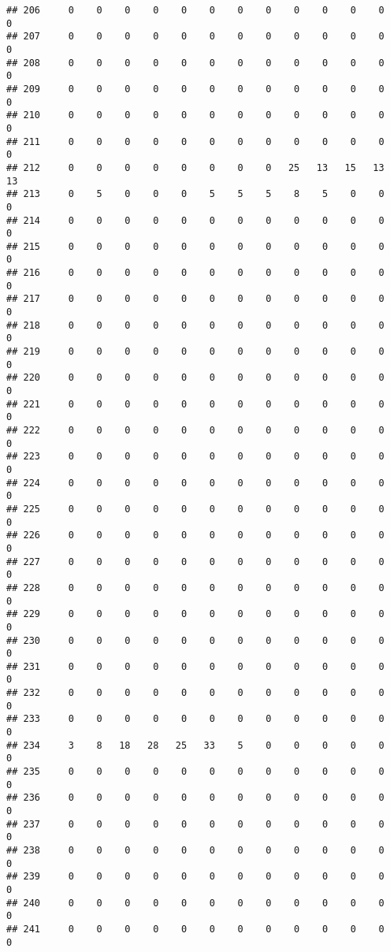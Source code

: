 \documentclass[]{article}
\begin{document}
\begin{verbatim}
## 206     0    0    0    0    0    0    0    0    0    0    0    0    0
## 207     0    0    0    0    0    0    0    0    0    0    0    0    0
## 208     0    0    0    0    0    0    0    0    0    0    0    0    0
## 209     0    0    0    0    0    0    0    0    0    0    0    0    0
## 210     0    0    0    0    0    0    0    0    0    0    0    0    0
## 211     0    0    0    0    0    0    0    0    0    0    0    0    0
## 212     0    0    0    0    0    0    0    0   25   13   15   13   13
## 213     0    5    0    0    0    5    5    5    8    5    0    0    0
## 214     0    0    0    0    0    0    0    0    0    0    0    0    0
## 215     0    0    0    0    0    0    0    0    0    0    0    0    0
## 216     0    0    0    0    0    0    0    0    0    0    0    0    0
## 217     0    0    0    0    0    0    0    0    0    0    0    0    0
## 218     0    0    0    0    0    0    0    0    0    0    0    0    0
## 219     0    0    0    0    0    0    0    0    0    0    0    0    0
## 220     0    0    0    0    0    0    0    0    0    0    0    0    0
## 221     0    0    0    0    0    0    0    0    0    0    0    0    0
## 222     0    0    0    0    0    0    0    0    0    0    0    0    0
## 223     0    0    0    0    0    0    0    0    0    0    0    0    0
## 224     0    0    0    0    0    0    0    0    0    0    0    0    0
## 225     0    0    0    0    0    0    0    0    0    0    0    0    0
## 226     0    0    0    0    0    0    0    0    0    0    0    0    0
## 227     0    0    0    0    0    0    0    0    0    0    0    0    0
## 228     0    0    0    0    0    0    0    0    0    0    0    0    0
## 229     0    0    0    0    0    0    0    0    0    0    0    0    0
## 230     0    0    0    0    0    0    0    0    0    0    0    0    0
## 231     0    0    0    0    0    0    0    0    0    0    0    0    0
## 232     0    0    0    0    0    0    0    0    0    0    0    0    0
## 233     0    0    0    0    0    0    0    0    0    0    0    0    0
## 234     3    8   18   28   25   33    5    0    0    0    0    0    0
## 235     0    0    0    0    0    0    0    0    0    0    0    0    0
## 236     0    0    0    0    0    0    0    0    0    0    0    0    0
## 237     0    0    0    0    0    0    0    0    0    0    0    0    0
## 238     0    0    0    0    0    0    0    0    0    0    0    0    0
## 239     0    0    0    0    0    0    0    0    0    0    0    0    0
## 240     0    0    0    0    0    0    0    0    0    0    0    0    0
## 241     0    0    0    0    0    0    0    0    0    0    0    0    0

\end{verbatim}
\end{document}
